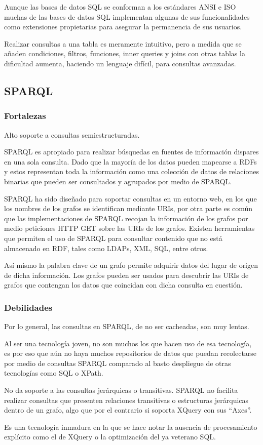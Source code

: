 Aunque las bases de datos SQL se conforman a los estándares ANSI e ISO muchas de las bases de datos SQL implementan algunas de sus funcionalidades como extensiones propietarias para asegurar la permanencia de sus usuarios.

Realizar consultas a una tabla es meramente intuitivo, pero a medida que se añaden condiciones, filtros, funciones, inner queries y joins con otras tablas la dificultad aumenta, haciendo un lenguaje difícil, para consultas avanzadas.

\subsection{SPARQL}

\subsubsection{Fortalezas}

Alto soporte a consultas semiestructuradas.

SPARQL es apropiado para realizar búsquedas en fuentes de información dispares en una sola consulta. Dado que la mayoría de los datos pueden mapearse a RDFs y estos representan toda la información como una colección de datos de relaciones binarias que pueden ser consultados y agrupados por medio de SPARQL.

SPARQL ha sido diseñado para soportar consultas en un entorno web, en los que los nombres de los grafos se identifican mediante URIs, por otra parte es común que las implementaciones de SPARQL recojan la información de los grafos por medio peticiones HTTP GET sobre las URIs de los grafos.
Existen herramientas que permiten el uso de SPARQL para consultar contenido que no está almacenado en RDF, tales como LDAPs, XML, SQL, entre otros.

Así mismo la palabra clave de un grafo permite adquirir datos del lugar de origen de dicha información. Los grafos pueden ser usados para descubrir las URIs de grafos que contengan los datos que coincidan con dicha consulta en cuestión.

\subsubsection{Debilidades}

Por lo general, las consultas en SPARQL, de no ser cacheadas, son muy lentas.

Al ser una tecnología joven, no son muchos los que hacen uso de esa tecnología, es por eso que aún no haya muchos repositorios de datos que puedan recolectarse por medio de consultas SPARQL comparado al basto despliegue de otras tecnologías como SQL o XPath\cite{XPath}.

No da soporte a las consultas jerárquicas o transitivas. SPARQL no facilita realizar consultas que presenten relaciones transitivas o estructuras jerárquicas dentro de un grafo, algo que por el contrario si soporta XQuery con sus ``Axes''.

Es una tecnología inmadura en la que se hace notar la ausencia de procesamiento explícito como el de XQuery o la optimización del ya veterano SQL.
